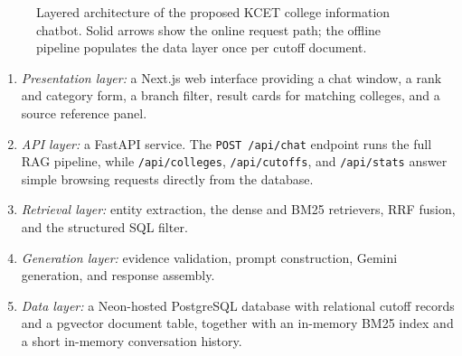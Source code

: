 \documentclass[conference]{IEEEtran}
\begin{document}
\begin{figure}[!t]
{%
}
\caption{Layered architecture of the proposed KCET college information
chatbot. Solid arrows show the online request path; the offline pipeline
populates the data layer once per cutoff document.}
\label{fig:architecture}
\end{figure}

\begin{enumerate}
    \item \textit{Presentation layer:} a Next.js web interface
    providing a chat window, a rank and category form, a branch
    filter, result cards for matching colleges, and a source
    reference panel.

    \item \textit{API layer:} a FastAPI service. The
    \texttt{POST /api/chat} endpoint runs the full RAG pipeline,
    while \texttt{/api/colleges}, \texttt{/api/cutoffs}, and
    \texttt{/api/stats} answer simple browsing requests directly
    from the database.

    \item \textit{Retrieval layer:} entity extraction, the dense
    and BM25 retrievers, RRF fusion, and the structured SQL filter.

    \item \textit{Generation layer:} evidence validation, prompt
    construction, Gemini generation, and response assembly.

    \item \textit{Data layer:} a Neon-hosted PostgreSQL database
    with relational cutoff records and a pgvector document table,
    together with an in-memory BM25 index and a short in-memory
    conversation history.
\end{enumerate}
\end{document}
